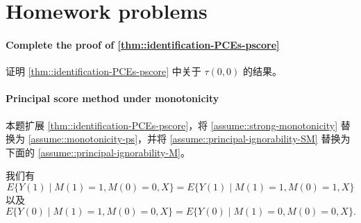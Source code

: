 \section{Homework problems}


\paragraph{Complete the proof of \cref{thm::identification-PCEs-pscore}}\label{hw::proof-part2-identification-PCEs}

证明 \cref{thm::identification-PCEs-pscore} 中关于 $\tau(0,0)$ 的结果。


 
\paragraph{Principal score method under monotonicity}\label{para::prinpscore-mono}



本题扩展 \cref{thm::identification-PCEs-pscore}，将 \cref{assume::strong-monotonicity} 替换为 \cref{assume::monotonicity-ps}，并将 \cref{assume::principal-ignorability-SM} 替换为下面的 \cref{assume::principal-ignorability-M}。

\begin{assumption}
\label{assume::principal-ignorability-M}
我们有
$$
E\{  Y(1) \mid M(1) = 1, M(0) =0, X \} = E\{  Y(1) \mid M(1) = 1, M(0) =1, X \}
$$
以及
$$
E\{  Y(0) \mid M(1) = 1, M(0) =0, X \} = E\{  Y(0) \mid M(1) = 0, M(0) =0, X \}. 
$$
\end{assumption}



